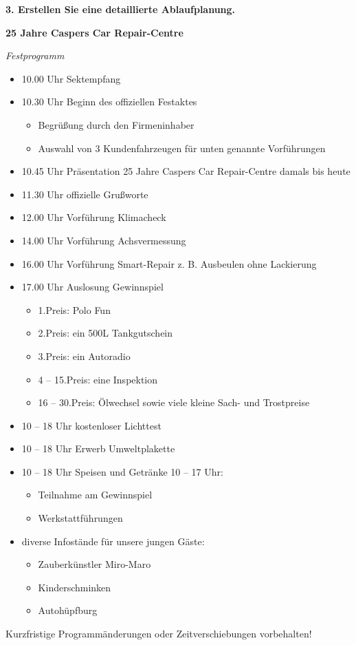 \newpage

\textbf{3. Erstellen Sie eine detaillierte Ablaufplanung.}

\textbf{25 Jahre Caspers Car Repair-Centre}

\emph{Festprogramm}

\begin{itemize}
\item
  10.00 Uhr Sektempfang
\item
  10.30 Uhr Beginn des offiziellen Festaktes

  \begin{itemize}
  \item
    Begrüßung durch den Firmeninhaber
  \item
    Auswahl von 3 Kundenfahrzeugen für unten genannte Vorführungen
  \end{itemize}
\item
  10.45 Uhr Präsentation 25 Jahre Caspers Car Repair-Centre damals bis
  heute
\item
  11.30 Uhr offizielle Grußworte
\item
  12.00 Uhr Vorführung Klimacheck
\item
  14.00 Uhr Vorführung Achsvermessung
\item
  16.00 Uhr Vorführung Smart-Repair z. B. Ausbeulen ohne Lackierung
\item
  17.00 Uhr Auslosung Gewinnspiel

  \begin{itemize}
  \item
    1.Preis: Polo Fun
  \item
    2.Preis: ein 500L Tankgutschein
  \item
    3.Preis: ein Autoradio
  \item
    4 -- 15.Preis: eine Inspektion
  \item
    16 -- 30.Preis: Ölwechsel sowie viele kleine Sach- und Trostpreise
  \end{itemize}
\item
  10 -- 18 Uhr kostenloser Lichttest
\item
  10 -- 18 Uhr Erwerb Umweltplakette
\item
  10 -- 18 Uhr Speisen und Getränke 10 -- 17 Uhr:

  \begin{itemize}
  \item
    Teilnahme am Gewinnspiel
  \item
    Werkstattführungen
  \end{itemize}
\item
  diverse Infostände für unsere jungen Gäste:

  \begin{itemize}
  \item
    Zauberkünstler Miro-Maro
  \item
    Kinderschminken
  \item
    Autohüpfburg
  \end{itemize}
\end{itemize}

Kurzfristige Programmänderungen oder Zeitverschiebungen vorbehalten!
